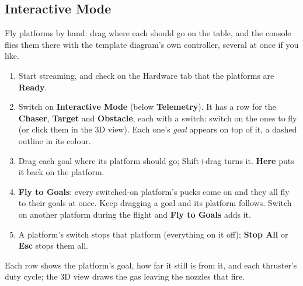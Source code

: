 \documentclass[11pt,a4paper]{article}
\newcommand{\ui}[1]{\textsf{\textbf{#1}}}
\begin{document}
\subsection{Interactive Mode}
Fly platforms by hand: drag where each should go on the table, and the console flies them there with the
template diagram's own controller, several at once if you like.
\begin{enumerate}
  \item Start streaming, and check on the Hardware tab that the platforms are \ui{Ready}.
  \item Switch on \ui{Interactive Mode} (below \ui{Telemetry}). It has a row for the \ui{Chaser}, \ui{Target} and
        \ui{Obstacle}, each with a switch: switch on the ones to fly (or click them in the 3D view). Each one's
        \emph{goal} appears on top of it, a dashed outline in its colour.
  \item Drag each goal where its platform should go; Shift+drag turns it. \ui{Here} puts it back on the platform.
  \item \ui{Fly to Goals}: every switched-on platform's pucks come on and they all fly to their goals at once.
        Keep dragging a goal and its platform follows. Switch on another platform during the flight and
        \ui{Fly to Goals} adds it.
  \item A platform's switch stops that platform (everything on it off); \ui{Stop All} or \textbf{Esc} stops them all.
\end{enumerate}
Each row shows the platform's goal, how far it still is from it, and each thruster's duty cycle; the 3D view
draws the gas leaving the nozzles that fire.
\end{document}
